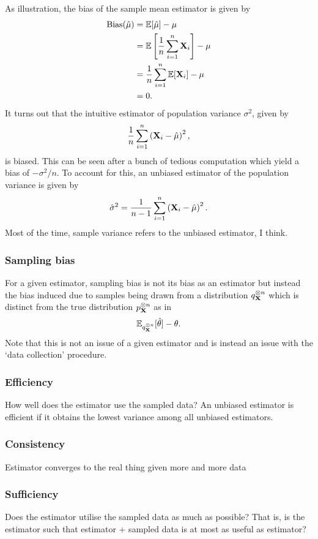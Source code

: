 \documentclass[11pt]{article}
\begin{document}
\begin{appendices}
As illustration, the bias of the sample mean estimator is given by
\begin{align*}
    \text{Bias}(\hat{\mu})
    &=
    \mathbb{E}[\hat{\mu}]-\mu\\
    &=
    \mathbb{E}\left[\frac{1}{n}\sum_{i=1}^n\mathbf{X}_i\right]-\mu\\
    &=
    \frac{1}{n}\sum_{i=1}^n\mathbb{E}[\mathbf{X}_i]-\mu\\
    &=
    0.
\end{align*}
It turns out that the intuitive estimator of population variance $\sigma^2$, given by
$$
\frac{1}{n}\sum_{i=1}^n\left(\mathbf{X}_i-\hat{\mu}\right)^2,
$$
is biased. This can be seen after a bunch of tedious computation which yield a bias of $-\sigma^2/n$. To account for this, an unbiased estimator of the population variance is given by
$$
\hat{\sigma}^2
=
\frac{1}{n-1}\sum_{i=1}^n\left(\mathbf{X}_i-\hat{\mu}\right)^2.
$$
Most of the time, sample variance refers to the unbiased estimator, I think.

\subsubsection{Sampling bias}
For a given estimator, sampling bias is not its bias as an estimator but instead the bias induced due to samples being drawn from a distribution $q_{\mathbf{X}}^{\otimes n}$ which is distinct from the true distribution $p_{\mathbf{X}}^{\otimes n}$ as in
$$\mathbb{E}_{q_{\mathbf{X}}^{\otimes n}}[\hat{\theta}]-\theta.$$
Note that this is not an issue of a given estimator and is instead an issue with the `data collection' procedure.

\subsubsection{Efficiency}
How well does the estimator use the sampled data? An unbiased estimator is efficient if it obtains the lowest variance among all unbiased estimators.

\subsubsection{Consistency}
Estimator converges to the real thing given more and more data

\subsubsection{Sufficiency}
Does the estimator utilise the sampled data as much as possible? That is, is the estimator such that estimator + sampled data is at most as useful as estimator?


\end{appendices}
\end{document}
